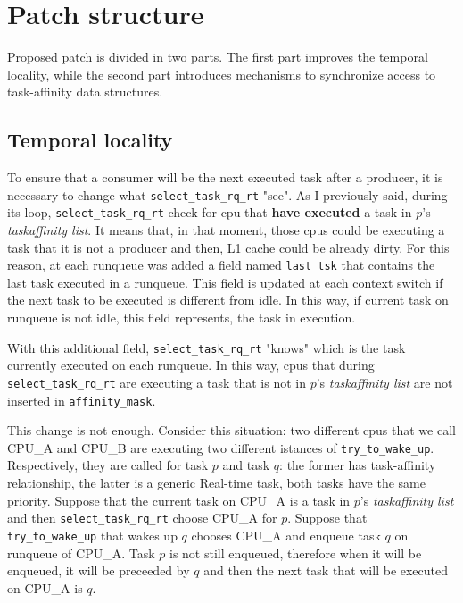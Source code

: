 \section{Patch structure}

Proposed patch is divided in two parts. The first part improves the temporal locality, while the second part introduces mechanisms to synchronize access to 
task-affinity data structures.

\subsection{Temporal locality}

To ensure that a consumer will be the next executed task after a producer, it is necessary to change what \texttt{select\_task\_rq\_rt} "see". As I 
previously said, during its loop, \texttt{select\_task\_rq\_rt} check for cpu that \textbf{have executed} a task in $p$'s \textit{taskaffinity list}. 
It means that, in that moment, those cpus could be executing a task that it is not a producer and then, L1 cache could be already dirty. For this reason, 
at each runqueue was added a field named \texttt{last\_tsk} that contains the last task executed in a runqueue. This field is updated at each context switch 
if the next task to be executed is different from idle. In this way, if current task on runqueue is not idle, this field represents, the task in execution. 

With this additional field, \texttt{select\_task\_rq\_rt} "knows" which is the task currently executed on each runqueue. In this way, cpus that during 
\texttt{select\_task\_rq\_rt} are executing a task that is not in $p$'s \textit{taskaffinity list} are not inserted in \texttt{affinity\_mask}.

This change is not enough. Consider this situation: two different cpus that we call CPU\_A and CPU\_B are executing two different istances of 
\texttt{try\_to\_wake\_up}. Respectively, they are called for task $p$ and task $q$: the former has task-affinity relationship, the latter is a generic 
Real-time task, both tasks have the same priority. Suppose that the current task on CPU\_A is a task in $p$'s \textit{taskaffinity list} and then 
\texttt{select\_task\_rq\_rt} choose CPU\_A for $p$. Suppose that \texttt{try\_to\_wake\_up} that wakes up $q$ chooses CPU\_A and enqueue task $q$ on 
runqueue of CPU\_A. Task $p$ is not still enqueued, therefore when it will be enqueued, it will be preceeded by $q$ and then the next task that will
be executed on CPU\_A is $q$.

